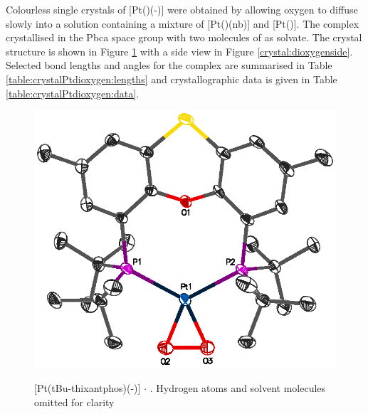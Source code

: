 Colourless single crystals of [Pt(\tButhixantphos)(\hapto{}-)] were obtained by allowing oxygen to diffuse slowly into a  solution containing a mixture of [Pt(\tButhixantphos)(nb)] and [Pt(\tButhixantphos)].  The complex crystallised in the Pbca space group with two molecules of  as solvate.  The crystal structure is shown in Figure \ref{crystal:dioxygen} with a side view in Figure \ref{crystal:dioxygenside}.  Selected bond lengths and angles for the complex are summarised in Table \ref{table:crystalPtdioxygen:lengths} and crystallographic data is given in Table \ref{table:crystalPtdioxygen:data}.  

\begin{figure}[ht]
\begin{center}
\vspace{0.5cm}
\includegraphics{../Figures/Crystalplatinumdioxygen.eps}
\caption[X-ray crystal structure of [Pt(tBu-thixantphos)(\hapto{}-){]} $\cdot{}$ ]{[Pt(tBu-thixantphos)(\hapto{}-)] $\cdot{}$ .  Hydrogen atoms and solvent molecules omitted for clarity}
\vspace{0.2cm}
\label{crystal:dioxygen}
\end{center}
\end{figure}
\vspace{0.2cm}

